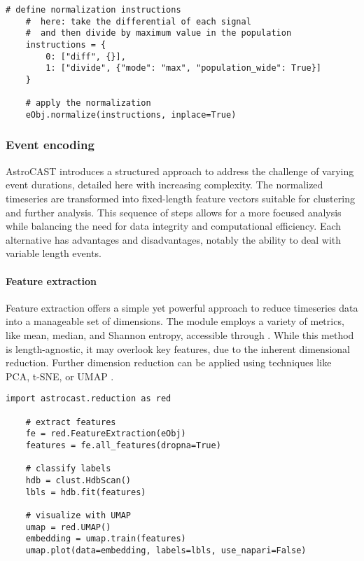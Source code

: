 \begin{lstlisting}[style=pyStyle]
    # define normalization instructions
    #  here: take the differential of each signal
    #  and then divide by maximum value in the population
    instructions = {
        0: ["diff", {}],
        1: ["divide", {"mode": "max", "population_wide": True}]
    }

    # apply the normalization
    eObj.normalize(instructions, inplace=True)
\end{lstlisting}

\subsubsection{Event encoding}

AstroCAST introduces a structured approach to address the challenge of varying event durations, detailed here with increasing complexity. The normalized timeseries are transformed into fixed-length feature vectors suitable for clustering and further analysis. This sequence of steps allows for a more focused analysis while balancing the need for data integrity and computational efficiency. Each alternative has advantages and disadvantages, notably the ability to deal with variable length events.

\paragraph{Feature extraction}
Feature extraction offers a simple yet powerful approach to reduce timeseries data into a manageable set of dimensions. The module employs a variety of metrics, like mean, median, and Shannon entropy, accessible through . While this method is length-agnostic, it may overlook key features, due to the inherent dimensional reduction. Further dimension reduction can be applied using techniques like PCA, t-SNE, or UMAP .

\begin{lstlisting}[style=pyStyle]
    import astrocast.reduction as red

    # extract features
    fe = red.FeatureExtraction(eObj)
    features = fe.all_features(dropna=True)

    # classify labels
    hdb = clust.HdbScan()
    lbls = hdb.fit(features)

    # visualize with UMAP
    umap = red.UMAP()
    embedding = umap.train(features)
    umap.plot(data=embedding, labels=lbls, use_napari=False)
\end{lstlisting}

